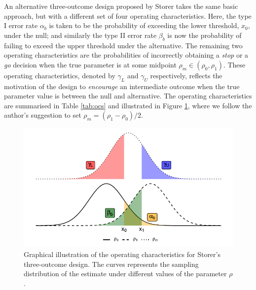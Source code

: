 \documentclass[sagev]{sagej}
\begin{document}
An alternative three-outcome design proposed by Storer \cite{Storer1992} takes the same basic approach, but with a different set of four operating characteristics. Here, the type I error rate $\alpha_b$ is taken to be the probability of exceeding the lower threshold, $x_0$, under the null; and similarly the type II error rate $\beta_b$ is now the probability of failing to exceed the upper threshold under the alternative. The remaining two operating characteristics are the probabilities of incorrectly obtaining a \emph{stop} or a \emph{go} decision when the true parameter is at some midpoint $\rho_m \in (\rho_0, \rho_1)$. These operating characteristics, denoted by $\gamma_L$ and $\gamma_U$ respectively, reflects the motivation of the design to \emph{encourage} an intermediate outcome when the true parameter value is between the null and alternative. The operating characteristics are summarised in Table \ref{tab:ocs} and illustrated in Figure \ref{fig:Stor_ocs}, where we follow the author's suggestion to set $\rho_m = (\rho_1 - \rho_0)/2$.

\begin{figure}
\centering
\includegraphics[scale=0.8]{./figures/Stor_ocs}
\caption{Graphical illustration of the operating characteristics for Storer's three-outcome design\cite{Storer1992}. The curves represents the sampling distribution of the estimate under different values of the parameter $\rho$.}
\label{fig:Stor_ocs}
\end{figure}
\end{document}
